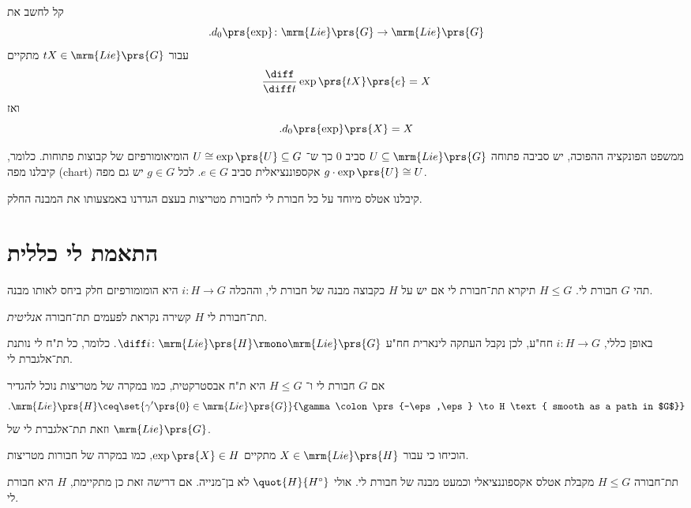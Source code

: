 \documentclass[10pt, twoside]{book}
\newcommand{\textenglish}[1]{\foreignlanguage{english}{#1}}
\newcommand{\Lie}{\mrm{Lie}}
\begin{document}
\begin{remark}
קל לחשב את
\[\text{.} d_0\prs{\exp} \colon \Lie\prs{G} \to \Lie\prs{G}\]
עבור
$tX \in \Lie\prs{G}$
מתקיים
\[\frac{\diff}{\diff t} \exp\prs{tX} \prs{e} = X\]
ואז
\[\text{.} d_0 \prs{\exp}\prs{X} = X\]

ממשפט הפונקציה ההפוכה, יש סביבה פתוחה
$U \subseteq \Lie\prs{G}$
סביב
$0$
כך ש־%
$U \cong \exp\prs{U} \subseteq G$
הומיאומורפיזם של קבוצות פתוחות.
כלומר, קיבלנו מפה (\textenglish{chart}) אקספוננציאלית סביב
$e \in G$.
לכל
$g \in G$
יש גם מפה
$g \cdot \exp\prs{U} \cong U$.

קיבלנו אטלס מיוחד על כל חבורת לי לחבורת מטריצות בעצם הגדרנו באמצעותו את המבנה החלק.
\end{remark}

\section{התאמת לי כללית}

\begin{definition}[תת־חבורת לי]
תהי
$G$
חבורת לי.
$H \leq G$
תיקרא תת־חבורת לי אם יש על
$H$
כקבוצה מבנה של חבורת לי, וההכלה
$i \colon H \to G$
היא הומומורפיזם חלק ביחס לאותו מבנה.
\end{definition}

\begin{remark}
תת־חבורת לי
$H$
קשירה נקראת לפעמים תת־חבורה
\emph{אנליטית}.
\end{remark}

\begin{remark}
באופן כללי,
$i \colon H \to G$
חח"ע, לכן נקבל העתקה לינארית חח"ע
$\diff i \colon \Lie\prs{H} \rmono \Lie\prs{G}$.
כלומר, כל ת"ח לי נותנת תת־אלגברת לי.
\end{remark}

\begin{definition}
אם
$G$
חבורת לי ו־%
$H \leq G$
היא ת"ח אבסטרקטית, כמו במקרה של מטריצות נוכל להגדיר
\[\text{.} \Lie\prs{H} \ceq \set{\gamma'\prs{0} \in \Lie\prs{G}}{\gamma \colon \prs{-\eps,\eps} \to H \text{ smooth as a path in $G$}}\]
וזאת תת־אלגברת לי של
$\Lie\prs{G}$.
\end{definition}

\begin{exercise}
הוכיחו כי עבור
$X \in \Lie\prs{H}$
מתקיים
$\exp\prs{X} \in H$,
כמו במקרה של חבורות מטריצות.
\end{exercise}

\begin{corollary}
תת־חבורה
$H \leq G$
מקבלת אטלס אקספוננציאלי וכמעט מבנה של חבורת לי. אולי
$\quot{H}{H^\circ}$
לא בן־מנייה. אם דרישה זאת כן מתקיימת,
$H$
היא חבורת לי.
\end{corollary}
\end{document}
